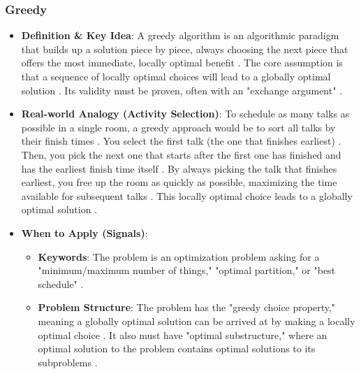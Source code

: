 \documentclass{article}
\begin{document}
\subsubsection{Greedy}
\begin{itemize}
\item \textbf{Definition \& Key Idea}: A greedy algorithm is an algorithmic paradigm that builds up a solution piece by piece, always choosing the next piece that offers the most immediate, locally optimal benefit \cite{438, 439}. The core assumption is that a sequence of locally optimal choices will lead to a globally optimal solution \cite{439, 440}. Its validity must be proven, often with an "exchange argument" \cite{441}.
\item \textbf{Real-world Analogy (Activity Selection)}: To schedule as many talks as possible in a single room, a greedy approach would be to sort all talks by their finish times \cite{444}. You select the first talk (the one that finishes earliest) \cite{445}. Then, you pick the next one that starts after the first one has finished and has the earliest finish time itself \cite{446}. By always picking the talk that finishes earliest, you free up the room as quickly as possible, maximizing the time available for subsequent talks \cite{447}. This locally optimal choice leads to a globally optimal solution \cite{448}.
\item \textbf{When to Apply (Signals)}:
\begin{itemize}
\item \textbf{Keywords}: The problem is an optimization problem asking for a "minimum/maximum number of things," "optimal partition," or "best schedule" \cite{452}.
\item \textbf{Problem Structure}: The problem has the "greedy choice property," meaning a globally optimal solution can be arrived at by making a locally optimal choice \cite{453}. It also must have "optimal substructure," where an optimal solution to the problem contains optimal solutions to its subproblems \cite{454}.
\end{itemize}
\end{itemize}
\end{document}

